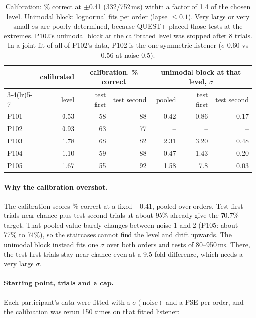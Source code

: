 \documentclass[11pt,a4paper]{article}
\begin{document}
\begin{table}[H]
\centering\small
\begin{tabular}{lrrrrrr}
\toprule
 & calibrated & \multicolumn{2}{c}{calibration, \% correct} & \multicolumn{3}{c}{unimodal block at that level, $\sigma$} \\
\cmidrule(lr){3-4}\cmidrule(lr){5-7}
 & level & test first & test second & pooled & test first & test second \\
\midrule
P101 & 0.53 & 58 & 88 & 0.42 & 0.86 & 0.17 \\
P102 & 0.93 & 63 & 77 & -- & -- & -- \\
P103 & 1.78 & 68 & 82 & 2.31 & 3.20 & 0.48 \\
P104 & 1.10 & 59 & 88 & 0.47 & 1.43 & 0.20 \\
P105 & 1.67 & 55 & 92 & 1.58 & 7.8 & 0.03 \\
\bottomrule
\end{tabular}
\caption{Calibration: \% correct at $\pm$0.41 (332/752\,ms) within a factor of 1.4 of the chosen level. Unimodal block: lognormal fits per order (lapse $\le 0.1$). Very large or very small $\sigma$s are poorly determined, because QUEST+ placed those tests at the extremes. P102's unimodal block at the calibrated level was stopped after 8 trials. In a joint fit of all of P102's data, P102 is the one symmetric listener ($\sigma$ 0.60 vs 0.56 at noise 0.5).}
\label{tab:order}
\end{table}

\paragraph{Why the calibration overshot.} The calibration scores \% correct at a fixed $\pm$0.41, pooled over orders. Test-first trials near chance plus test-second trials at about 95\% already give the 70.7\% target. That pooled value barely changes between noise 1 and 2 (P105: about 77\% to 74\%), so the staircases cannot find the level and drift upwards. The unimodal block instead fits one $\sigma$ over both orders and tests of 80--950\,ms. There, the test-first trials stay near chance even at a 9.5-fold difference, which needs a very large $\sigma$.

\paragraph{Starting point, trials and a cap.} Each participant's data were fitted with a $\sigma(\text{noise})$ and a PSE per order, and the calibration was rerun 150 times on that fitted listener:
\end{document}
